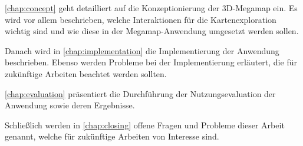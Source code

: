 \autoref{chap:concept} geht detailliert auf die Konzeptionierung der 3D-Megamap ein.
Es wird vor allem beschrieben, welche Interaktionen für die Kartenexploration wichtig sind und wie diese in der Megamap-Anwendung umgesetzt werden sollen.

Danach wird in \autoref{chap:implementation} die Implementierung der Anwendung beschrieben.
Ebenso werden Probleme bei der Implementierung erläutert, die für zukünftige Arbeiten beachtet werden sollten.

\autoref{chap:evaluation} präsentiert die Durchführung der Nutzungsevaluation der Anwendung sowie deren Ergebnisse.

Schließlich werden in \autoref{chap:closing} offene Fragen und Probleme dieser Arbeit genannt, welche für zukünftige Arbeiten von Interesse sind.
%
\cleardoublepage
